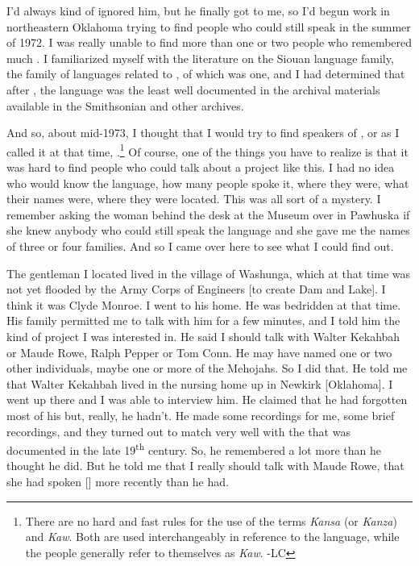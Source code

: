 \documentclass[output=paper]{LSP/langsci}
\begin{document}
I'd always kind of ignored him, but he finally got to me, so I'd begun work in northeastern Oklahoma trying to find people who could still speak  in the summer of 1972. I was really unable to find more than one or two people who remembered much . I familiarized myself with the literature on the Siouan language family, the family of languages related to  , of which  was one, and I had determined that after , the  language was the least well documented in the archival materials available in the Smithsonian and other archives. 

And so, about mid-1973, I thought that I would try to find speakers of , or as I called it at that time, .\footnote{There are no hard and fast rules for the use of the terms \textit{Kansa} (or \textit{Kanza}) and \textit{Kaw}. Both are used interchangeably in reference to the language, while the people generally refer to themselves as \textit{Kaw}. -LC} Of course, one of the things you have to realize is that it was hard to find people who could talk about a project like this. I had no idea who would know the  language, how many people spoke it, where they were, what their names were, where they were located. This was all sort of a mystery. I remember asking the woman behind the desk at the  Museum over in Pawhuska if she knew anybody who could still speak the  language and she gave me the names of three or four families. And so I came over here to see what I could find out. 

The gentleman I located lived in the village of Washunga, which at that time was not yet flooded by the Army Corps of Engineers [to create  Dam and  Lake]. I think it was Clyde Monroe. I went to his home. He was bedridden at that time. His family permitted me to talk with him for a few minutes, and I told him the kind of project I was interested in. He said I should talk with Walter Kekahbah or Maude Rowe, Ralph Pepper or Tom Conn. He may have named one or two other individuals, maybe one or more of the Mehojahs. So I did that. He told me that Walter Kekahbah lived in the nursing home up in Newkirk [Oklahoma]. I went up there and I was able to interview him. He claimed that he had forgotten most of his  but, really, he hadn't. He made some recordings for me, some brief recordings, and they turned out to match very well with the  that was documented in the late 19\textsuperscript{th} century. So, he remembered a lot more  than he thought he did. But he told me that I really should talk with Maude Rowe, that she had spoken [] more recently than he had. 
\end{document}
